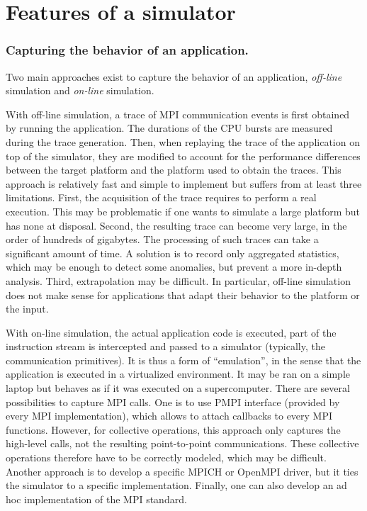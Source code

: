 \documentclass[12pt, a4paper]{memoir}
\begin{document}
\section{Features of a simulator}
\label{sec:org27c0a2f}
\subsubsection{Capturing the behavior of an application.}
\label{sec:orgda424dc}
Two main approaches exist to capture the behavior of an application, \emph{off-line} simulation and \emph{on-line} simulation.

With off-line simulation, a trace of MPI communication events is first obtained by running the application. The
durations of the CPU bursts are measured during the trace generation. Then, when replaying the trace of the
application on top of the simulator, they are modified to account for the performance differences between the
target platform and the platform used to obtain the traces. This approach is relatively fast and simple to
implement but suffers from at least three limitations. First, the acquisition of the trace requires to perform a
real execution. This may be problematic if one wants to simulate a large platform but has none at disposal. Second,
the resulting trace can become very large, in the order of hundreds of gigabytes. The processing of such traces can
take a significant amount of time. A solution is to record only aggregated statistics, which may be enough to
detect some anomalies, but prevent a more in-depth analysis. Third, extrapolation may be difficult. In particular,
off-line simulation does not make sense for applications that adapt their behavior to the platform or the input.

With on-line simulation, the actual application code is executed, part of the instruction stream is intercepted and
passed to a simulator (typically, the communication primitives). It is thus a form of “emulation”, in the sense
that the application is executed in a virtualized environment. It may be ran on a simple laptop but behaves as if
it was executed on a supercomputer. There are several possibilities to capture MPI calls. One is to use PMPI
interface (provided by every MPI implementation), which allows to attach callbacks to every MPI functions. However,
for collective operations, this approach only captures the high-level calls, not the resulting point-to-point
communications. These collective operations therefore have to be correctly modeled, which may be difficult. Another
approach is to develop a specific MPICH or OpenMPI driver, but it ties the simulator to a specific
implementation. Finally, one can also develop an ad hoc implementation of the MPI standard.
\end{document}
